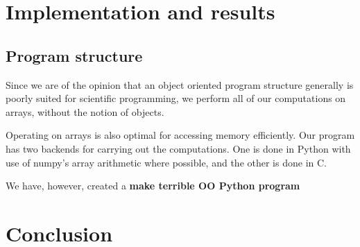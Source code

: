 \documentclass[a4paper]{article}
\begin{document}
\section{Implementation and results}\label{sec:implementation_and_results}
\subsection{Program structure}
Since we are of the opinion that an object oriented program structure generally is poorly suited for scientific programming, we perform all of our computations on arrays, without the notion of objects.

Operating on arrays is also optimal for accessing memory efficiently. Our program has two backends for carrying out the computations. One is done in Python with use of numpy's array arithmetic where possible, and the other is done in C.

We have, however, created a \textbf{make terrible OO Python program}


\section{Conclusion}\label{sec:conclusion}


%
%

{}
\end{document}
